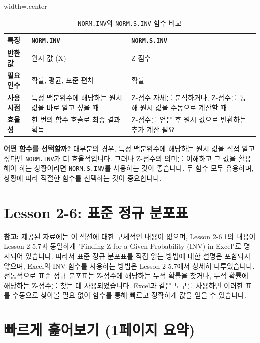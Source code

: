 \documentclass[11pt,a4paper]{article}
\theoremstyle{definition}
\newcommand{\newsection}[1]{\newpage\section{#1}}
\begin{document}
\begin{table}[h!]
\centering
\caption{\texttt{NORM.INV}와 \texttt{NORM.S.INV} 함수 비교}
\label{tab:inv_functions_comparison}
\begin{adjustbox}{width=\textwidth,center}
\begin{tabular}{lll}
\toprule
\textbf{특징} & \textbf{\texttt{NORM.INV}} & \textbf{\texttt{NORM.S.INV}} \\
\midrule
\textbf{반환 값} & 원시 값 (X) & Z-점수 \\
\textbf{필요 인수} & 확률, 평균, 표준 편차 & 확률 \\
\textbf{사용 시점} & 특정 백분위수에 해당하는 원시 값을 바로 알고 싶을 때 & Z-점수 자체를 분석하거나, Z-점수를 통해 원시 값을 수동으로 계산할 때 \\
\textbf{효율성} & 한 번의 함수 호출로 최종 결과 획득 & Z-점수를 얻은 후 원시 값으로 변환하는 추가 계산 필요 \\
\bottomrule
\end{tabular}
\end{adjustbox}
\end{table}

\begin{infobox}
    \textbf{어떤 함수를 선택할까?}
    대부분의 경우, 특정 백분위수에 해당하는 원시 값을 직접 알고 싶다면 \texttt{NORM.INV}가 더 효율적입니다.
    그러나 Z-점수의 의미를 이해하고 그 값을 활용해야 하는 상황이라면 \texttt{NORM.S.INV}를 사용하는 것이 좋습니다.
    두 함수 모두 유용하며, 상황에 따라 적절한 함수를 선택하는 것이 중요합니다.
\end{infobox}

\newsection{Lesson 2-6: 표준 정규 분포표}

\begin{summarybox}
    \textbf{참고:}
    제공된 자료에는 이 섹션에 대한 구체적인 내용이 없으며, Lesson 2-6.1의 내용이 Lesson 2-5.7과 동일하게 "Finding Z for a Given Probability (INV) in Excel"로 명시되어 있습니다.
    따라서 표준 정규 분포표를 직접 읽는 방법에 대한 설명은 포함되지 않으며, Excel의 INV 함수를 사용하는 방법은 Lesson 2-5.7에서 상세히 다루었습니다.
    전통적으로 표준 정규 분포표는 Z-점수에 해당하는 누적 확률을 찾거나, 누적 확률에 해당하는 Z-점수를 찾는 데 사용되었습니다.
    Excel과 같은 도구를 사용하면 이러한 표를 수동으로 찾아볼 필요 없이 함수를 통해 빠르고 정확하게 값을 얻을 수 있습니다.
\end{summarybox}

\newsection{빠르게 훑어보기 (1페이지 요약)}
\end{document}
